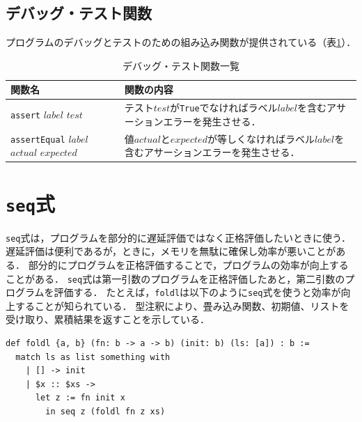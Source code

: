 \subsection{デバッグ・テスト関数}

プログラムのデバッグとテストのための組み込み関数が提供されている（表\ref{tab:debugFunctions}）．

\begin{table}[h]
  \begin{center}
    \begin{tabular}{ | l | p{9cm} |}
    \hline
    関数名 & 関数の内容 \\ \hline
    \texttt{assert} $label$ $test$ & テスト$test$が\texttt{True}でなければラベル$label$を含むアサーションエラーを発生させる． \\ \hline
    \texttt{assertEqual} $label$ $actual$ $expected$ & 値$actual$と$expected$が等しくなければラベル$label$を含むアサーションエラーを発生させる． \\ \hline
    \end{tabular}
\end{center}
    \caption{デバッグ・テスト関数一覧}
    \label{tab:debugFunctions}
\end{table}

\section{\texttt{seq}式}

\lstinline{seq}式は，プログラムを部分的に遅延評価ではなく正格評価したいときに使う．
遅延評価は便利であるが，ときに，メモリを無駄に確保し効率が悪いことがある．
部分的にプログラムを正格評価することで，プログラムの効率が向上することがある．
\lstinline{seq}式は第一引数のプログラムを正格評価したあと，第二引数のプログラムを評価する．
たとえば，\lstinline{foldl}は以下のように\lstinline{seq}式を使うと効率が向上することが知られている．
型注釈により、畳み込み関数、初期値、リストを受け取り、累積結果を返すことを示している．
\begin{lstlisting}[language=egison,numbers=none]
def foldl {a, b} (fn: b -> a -> b) (init: b) (ls: [a]) : b :=
  match ls as list something with
    | [] -> init
    | $x :: $xs ->
      let z := fn init x
        in seq z (foldl fn z xs)
\end{lstlisting}
      
